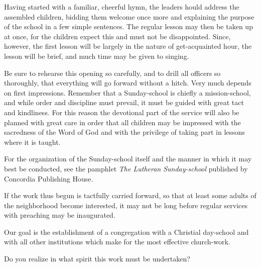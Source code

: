 \documentclass[
]{book}
\begin{document}
Having started with a familiar, cheerful hymn, the leaders hould address the assembled children, bidding them welcome once more and explaining the purpose of the school in a few simple sentences. The regular lesson may then be taken up at once, for the children expect this and must not be disappointed. Since, however, the first lesson will be largely in the nature of get-acquainted hour, the lesson will be brief, and much time may be given to singing.

Be sure to rehearse this opening so carefully, and to drill all officers so thoroughly, that everything will go forward without a hitch. Very much depends on first impressions. Remember that a Sunday-school is chiefly a mission-school, and while order and discipline must prevail, it must be guided with great tact and kindliness. For this reason the devotional part of the service will also be planned with great care in order that all children may be impressed with the sacredness of the Word of God and with the privilege of taking part in lessons where it is taught.

For the organization of the Sunday-school itself and the manner in which it may best be conducted, see the pamphlet \emph{The Lutheran Sunday-school} published by Concordia Publishing House.

If the work thus begun is tactfully carried forward, so that at least some adults of the neighborhood become interested, it may not be long before regular services with preaching may be inaugurated.

Our goal is the establishment of a congregation with a Christial day-school and with all other institutions which make for the most effective church-work.

Do you realize in what spirit this work must be undertaken?
\end{document}
